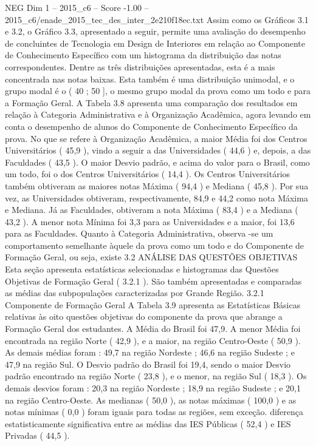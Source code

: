 \begin{textsample}{NEG Dim 1 – 2015\_c6 – Score -1.00 – 2015\_c6/enade\_2015\_tec\_des\_inter\_2e210f18ec.txt}
Assim como os Gráficos 3.1 e 3.2, o Gráfico 3.3, apresentado a seguir, permite uma avaliação do desempenho de concluintes de Tecnologia em Design de Interiores em relação ao Componente de Conhecimento Específico com um histograma da distribuição das notas correspondentes.
Dentre as três distribuições apresentadas, esta é a mais concentrada nas notas baixas.
Esta também é uma distribuição unimodal, e o grupo modal é o ( 40 ; 50 ], o mesmo grupo modal da prova como um todo e para a Formação Geral.
A Tabela 3.8 apresenta uma comparação dos resultados em relação à Categoria Administrativa e à Organização Acadêmica, agora levando em conta o desempenho de alunos do Componente de Conhecimento Específico da prova.
No que se refere à Organização Acadêmica, a maior Média foi dos Centros Universitários ( 45,9 ), vindo a seguir a das Universidades ( 44,6 ) e, depois, a das Faculdades ( 43,5 ).
O maior Desvio padrão, e acima do valor para o Brasil, como um todo, foi o dos Centros Universitários ( 14,4 ).
Os Centros Universitários também obtiveram as maiores notas Máxima ( 94,4 ) e Mediana ( 45,8 ).
Por sua vez, as Universidades obtiveram, respectivamente, 84,9 e 44,2 como nota Máxima e Mediana.
Já as Faculdades, obtiveram a nota Máxima ( 83,4 ) e a Mediana ( 43,2 ).
A menor nota Mínima foi 3,3 para as Universidades e a maior, foi 13,6 para as Faculdades.
Quanto à Categoria Administrativa, observa -se um comportamento semelhante àquele da prova como um todo e do Componente de Formação Geral, ou seja, existe 3.2 ANÁLISE DAS QUESTÕES OBJETIVAS Esta seção apresenta estatísticas selecionadas e histogramas das Questões Objetivas de Formação Geral ( 3.2.1 ).
São também apresentadas e comparadas as médias das subpopulações caracterizadas por Grande Região. 3.2.1 Componente de Formação Geral A Tabela 3.9 apresenta as Estatísticas Básicas relativas às oito questões objetivas do componente da prova que abrange a Formação Geral dos estudantes.
A Média do Brasil foi 47,9.
A menor Média foi encontrada na região Norte ( 42,9 ), e a maior, na região Centro-Oeste ( 50,9 ).
As demais médias foram : 49,7 na região Nordeste ; 46,6 na região Sudeste ; e 47,9 na região Sul.
O Desvio padrão do Brasil foi 19,4, sendo o maior Desvio padrão encontrado na região Norte ( 23,8 ), e o menor, na região Sul ( 18,3 ).
Os demais desvios foram : 20,3 na região Nordeste ; 18,9 na região Sudeste ; e 20,1 na região Centro-Oeste.
As medianas ( 50,0 ), as notas máximas ( 100,0 ) e as notas mínimas ( 0,0 ) foram iguais para todas as regiões, sem exceção. diferença estatisticamente significativa entre as médias das IES Públicas ( 52,4 ) e IES Privadas ( 44,5 ).

\end{textsample}
